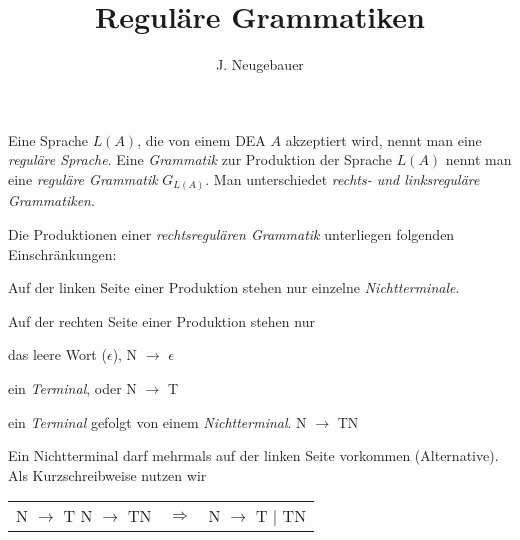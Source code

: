 \documentclass[10pt, a4paper]{scrartcl}
\author{J. Neugebauer}
\title{Reguläre Grammatiken}
\date{\Heute}
\begin{document}
\ReiheTitel

Eine Sprache $L(A)$, die von einem DEA $A$ akzeptiert wird, nennt man eine \emph{reguläre Sprache}. Eine \emph{Grammatik} zur Produktion der Sprache $L(A)$ nennt man eine \emph{reguläre Grammatik} $G_{L(A)}$. Man unterschiedet \emph{rechts- und linksreguläre Grammatiken}.

Die Produktionen einer \emph{rechtsregulären Grammatik} unterliegen folgenden Einschränkungen:
\begin{smallitemize}
	\item Auf der linken Seite einer Produktion stehen nur einzelne \emph{Nichtterminale}.
	\item Auf der rechten Seite einer Produktion stehen nur
	\begin{smallitemize}
		\item das leere Wort ($\epsilon$), \hspace{2cm} N $\rightarrow$ $\epsilon$
		\item ein \emph{Terminal}, oder \hspace{2cm} N $\rightarrow$ T
		\item ein \emph{Terminal} gefolgt von einem \emph{Nichtterminal}.  \hspace{2cm} N $\rightarrow$ TN
	\end{smallitemize}
\end{smallitemize}

Ein Nichtterminal darf mehrmals auf der linken Seite vorkommen (Alternative). Als Kurzschreibweise nutzen wir 
\begin{center}
\begin{tabular}{p{3cm}cp{3cm}}
N $\rightarrow$ T \newline N $\rightarrow$ TN 
& $\Rightarrow$ 
& N $\rightarrow$ T | TN
\end{tabular}
\end{center}
\end{document}

